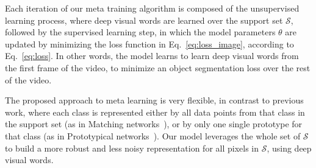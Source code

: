 \documentclass[10pt,twocolumn,letterpaper]{article}
\newcommand{\HB}[1]{{\color{blue}{HB: #1}}} %
\begin{document}
Each iteration of our meta training algorithm is composed of the unsupervised learning process, where deep visual words are learned over the support set $\mathcal{S}$, followed by the supervised learning step, in which the model parameters $\theta$ are updated by minimizing the loss function in Eq.~\ref{eq:loss_image}, according to Eq.~\ref{eq:loss}. In other words, the model learns to learn deep visual words from the first frame of the video, to minimize an object segmentation loss over the rest of the video.

The proposed approach to meta learning is very flexible, in contrast to previous work, where each class is represented either by all data points from that class in the support set (as in Matching networks~\cite{NIPS2016_6385}), or by only one single prototype for that class (as in Prototypical networks~\cite{NIPS2017_6996}).
Our model leverages the whole set of $\mathcal{S}$ to build a more robust and less noisy representation for all pixels in $\mathcal{S}$, using deep visual words.
\end{document}
